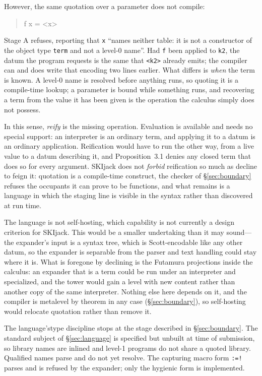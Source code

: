 \documentclass[english,submission,code=tt]{programming}
\begin{document}
However, the same quotation over a parameter does not compile:
\begin{quote}
\ttfamily f x = <x>
\end{quote}
\noindent
Stage A refuses, reporting that \texttt{x} ``names neither table: it
is not a constructor of the object type \texttt{term} and not a level-0
name''.  Had \texttt{f} been applied to \texttt{k2}, the datum
the program requests is the same that \texttt{<k2>} already
emits; the compiler can and does write that encoding two lines
earlier.  What differs is \emph{when} the term is known.  A \mbox{level-0}
name is resolved before anything runs, so quoting it is a compile-time
lookup; a parameter is bound while something runs, and recovering a
term from the value it has been given is the operation the calculus
simply does not possess.

In this sense, \emph{reify} is the missing operation.  Evaluation is 
available and needs no special support: an interpreter is an ordinary 
term, and applying it to a datum is an ordinary application.  
Reification would have to run the other way, from a live value
to a datum describing it, and Proposition~3.1 denies any closed term
that does so for every argument.  SKIjack does not \emph{forbid}
reification so much as decline to feign it: quotation is a
compile-time construct, the checker of \S\ref{sec:boundary} refuses the
occupants it can prove to be functions, and what remains is a language
in which the staging line is visible in the syntax rather than
discovered at run time.

The language is not self-hosting, which capability is not currently a 
design criterion for SKIjack.  This would be a smaller undertaking than 
it may sound---the expander's input is a syntax tree, which is 
Scott-encodable like any other datum, so the expander is separable from 
the parser and text handling could stay where it is.  What is foregone 
by declining is the Futamura projections
\citep{Futamura1971,JonesGomardSestoft1993} inside the calculus: an 
expander that is a term could be run under an interpreter and 
specialized, and the tower would gain a level with new content rather 
than another copy of the same interpreter.  Nothing else here
depends on it, and the compiler is metalevel by theorem in any case
(\S\ref{sec:boundary}), so self-hosting would relocate quotation rather
than remove it.

The language'stype discipline stops at the stage described in
\S\ref{sec:boundary}.  The standard subject of \S\ref{sec:language} is
specified but unbuilt at time of submission, so library names are inlined and level-1 programs
do not share a quoted library.  Qualified names parse and do not yet
resolve.
The capturing macro form \texttt{:=!} parses and is refused by the
expander; only the hygienic form is implemented.
\end{document}
